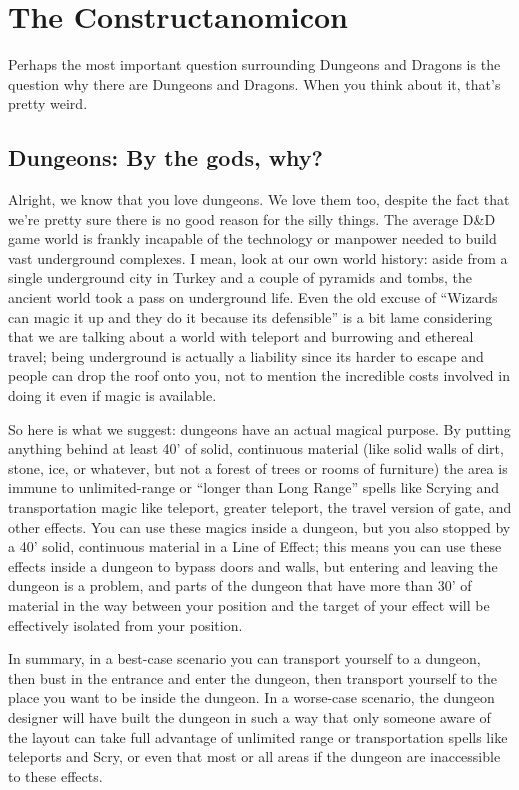 \section{The Constructanomicon}
\vspace*{-10pt}

Perhaps the most important question surrounding Dungeons and Dragons is the question why there are Dungeons and Dragons. When you think about it, that's pretty weird.

\subsection{Dungeons: By the gods, why?}

Alright, we know that you love dungeons. We love them too, despite the fact that we're pretty sure there is no good reason for the silly things. The average D\&D game world is frankly incapable of the technology or manpower needed to build vast underground complexes. I mean, look at our own world history: aside from a single underground city in Turkey and a couple of pyramids and tombs, the ancient world took a pass on underground life. Even the old excuse of ``Wizards can magic it up and they do it because its defensible'' is a bit lame considering that we are talking about a world with teleport and burrowing and ethereal travel; being underground is actually a liability since its harder to escape and people can drop the roof onto you, not to mention the incredible costs involved in doing it even if magic is available.

So here is what we suggest: dungeons have an actual magical purpose. By putting anything behind at least 40' of solid, continuous material (like solid walls of dirt, stone, ice, or whatever, but not a forest of trees or rooms of furniture) the area is immune to unlimited-range or ``longer than Long Range'' spells like Scrying and transportation magic like teleport, greater teleport, the travel version of gate, and other effects. You can use these magics inside a dungeon, but you also stopped by a 40' solid, continuous material in a Line of Effect; this means you can use these effects inside a dungeon to bypass doors and walls, but entering and leaving the dungeon is a problem, and parts of the dungeon that have more than 30' of material in the way between your position and the target of your effect will be effectively isolated from your position.

In summary, in a best-case scenario you can transport yourself to a dungeon, then bust in the entrance and enter the dungeon, then transport yourself to the place you want to be inside the dungeon. In a worse-case scenario, the dungeon designer will have built the dungeon in such a way that only someone aware of the layout can take full advantage of unlimited range or transportation spells like teleports and Scry, or even that most or all areas if the dungeon are inaccessible to these effects.

